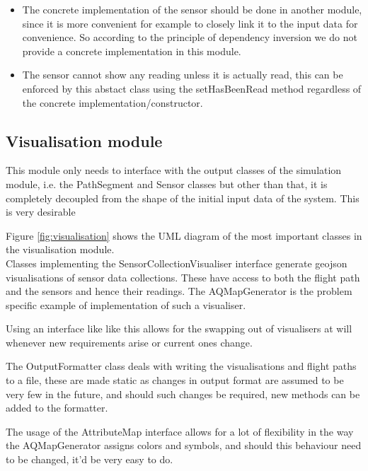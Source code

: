 \documentclass[10pt,a4paper]{article}
\begin{document}
\begin{itemize}
    \item The concrete implementation of the sensor should be done in another module, since it is more convenient for example to closely link it 
        to the input data for convenience. So according to the principle of dependency inversion we do not provide a concrete implementation in this module.
    \item The sensor cannot show any reading unless it is actually read, this can be enforced by this abstact class using the setHasBeenRead method regardless of the 
        concrete implementation/constructor.
\end{itemize}




\subsection{Visualisation module}
This module only needs to interface with the output classes of the simulation module, i.e. the PathSegment and Sensor classes but other than that, it is 
completely decoupled from the shape of the initial input data of the system. This is very desirable 
\par
Figure \ref{fig:visualisation} shows the UML diagram of the most important classes in the visualisation module.
\\
Classes implementing the SensorCollectionVisualiser interface generate geojson visualisations of sensor data collections.
These have access to both the flight path and the sensors and hence their readings. The AQMapGenerator is the problem specific example of implementation of such a visualiser.
\par
Using an interface like like this allows for the swapping out of visualisers at will whenever new requirements arise or current ones change.
\par 
The OutputFormatter class deals with writing the visualisations and flight paths to a file, these are made static as changes in output format are assumed to be very few in the future,
and should such changes be required, new methods can be added to the formatter.
\par 
The usage of the AttributeMap interface allows for a lot of flexibility in the way the AQMapGenerator assigns colors and symbols, and should this behaviour need to be changed, it'd be very easy to do.
\end{document}
